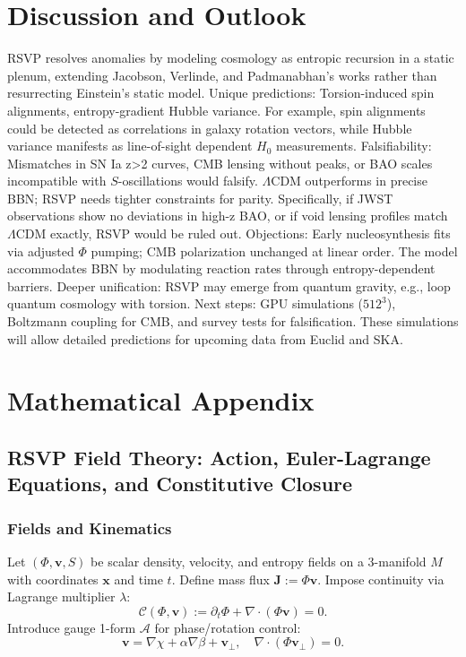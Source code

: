 \documentclass[11pt]{article}
\theoremstyle{plain}
\theoremstyle{definition}
\begin{document}
\section{Discussion and Outlook}
RSVP resolves anomalies by modeling cosmology as entropic recursion in a static plenum, extending Jacobson, Verlinde, and Padmanabhan's works rather than resurrecting Einstein's static model.
Unique predictions: Torsion-induced spin alignments, entropy-gradient Hubble variance. For example, spin alignments could be detected as correlations in galaxy rotation vectors, while Hubble variance manifests as line-of-sight dependent $H_0$ measurements.
Falsifiability: Mismatches in SN Ia z>2 curves, CMB lensing without peaks, or BAO scales incompatible with $S$-oscillations would falsify. $\Lambda$CDM outperforms in precise BBN; RSVP needs tighter constraints for parity. Specifically, if JWST observations show no deviations in high-z BAO, or if void lensing profiles match $\Lambda$CDM exactly, RSVP would be ruled out.
Objections: Early nucleosynthesis fits via adjusted $\Phi$ pumping; CMB polarization unchanged at linear order. The model accommodates BBN by modulating reaction rates through entropy-dependent barriers.
Deeper unification: RSVP may emerge from quantum gravity, e.g., loop quantum cosmology with torsion. Next steps: GPU simulations ($512^3$), Boltzmann coupling for CMB, and survey tests for falsification. These simulations will allow detailed predictions for upcoming data from Euclid and SKA.
\appendix
\section{Mathematical Appendix}
\subsection{RSVP Field Theory: Action, Euler-Lagrange Equations, and Constitutive Closure}
\subsubsection{Fields and Kinematics}
Let $(\Phi, \bm{v}, S)$ be scalar density, velocity, and entropy fields on a 3-manifold $M$ with coordinates $\bm{x}$ and time $t$. Define mass flux $\bm{J} := \Phi \bm{v}$. Impose continuity via Lagrange multiplier $\lambda$:
\[
\mathcal{C}(\Phi, \bm{v}) := \partial_t \Phi + \nabla \cdot (\Phi \bm{v}) = 0.
\]
Introduce gauge 1-form $\mathcal{A}$ for phase/rotation control:
\[
\bm{v} = \nabla \chi + \alpha \nabla \beta + \bm{v}_\perp, \quad \nabla \cdot (\Phi \bm{v}_\perp) = 0.
\]
\end{document}
